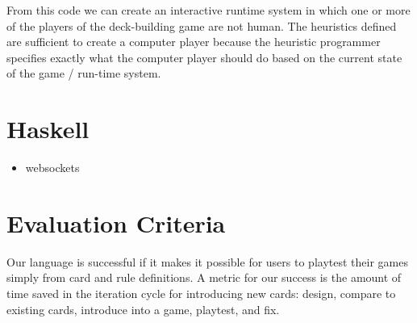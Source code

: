\documentclass{acm_proc_article-sp}
\begin{document}
From this code we can create an interactive runtime system in which one or more of the players
of the deck-building game are not human. The heuristics defined are sufficient to create a
computer player because the heuristic programmer specifies exactly what the computer player
should do based on the current state of the game / run-time system.

\section{Haskell}
\label{sec:haskell}
\begin{itemize}
\item websockets
\end{itemize}
\section{Evaluation Criteria}
\label{sec:evaluation}
Our language is successful if it makes it possible for users to playtest their games simply from card and rule definitions. A metric for our success is the amount of time saved in the iteration cycle for introducing new cards: design, compare to existing cards, introduce into a game, playtest, and fix.

\begin{biblist}
\end{biblist}

\end{document}
